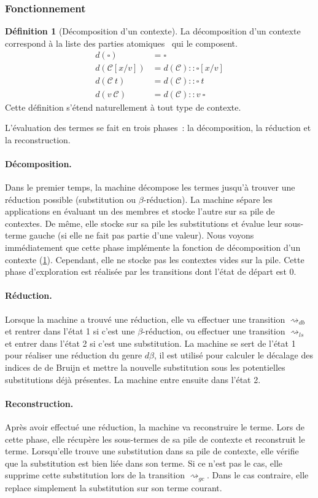 \documentclass[a4paper, 11pt]{article}
\theoremstyle{definition}
\newtheorem{definition}{Définition}[section]
\newcommand{\mcc}{\mathcal{C}}
\newcommand{\rsa}{\rightsquigarrow}
\begin{document}
\subsubsection{Fonctionnement}
\begin{definition}[Décomposition d'un contexte]
  \label{def:dec}
La décomposition d'un contexte correspond à la liste des parties \og atomiques \fg~qui le composent.
  \begin{align*}
    d(\square) &= \square \\
    d(\mcc[x/v]) &= d(\mcc)::\square[x/v]\\
    d(\mcc~t) &= d(\mcc)::\square~t\\
    d(v~\mcc) &= d(\mcc)::v~\square
  \end{align*} 
Cette définition s'étend naturellement à tout type de contexte.
\end{definition}
L'évaluation des termes se fait en trois phases~: la décomposition, la réduction et la reconstruction.
\paragraph{Décomposition.}
Dans le premier temps, la machine décompose les termes jusqu'à trouver une réduction possible (substitution ou $\beta$-réduction). 
La machine sépare les applications en évaluant un des membres et stocke l'autre sur sa pile de contextes. 
De même, elle stocke sur sa pile les substitutions et évalue leur sous-terme gauche (si elle ne fait pas partie d'une valeur). 
Nous voyons immédiatement que cette phase implémente la fonction de décomposition d'un contexte (\ref{def:dec}).
Cependant, elle ne stocke pas les contextes vides sur la pile.
Cette phase d'exploration est réalisée par les transitions dont l'état de départ est 0. 

\paragraph{Réduction.}
Lorsque la machine a trouvé une réduction, elle va effectuer une transition $\rsa_{db}$ et rentrer dans l'état 1 si c'est une $\beta$-réduction, ou effectuer une transition $\rsa_{ls}$ et entrer dans l'état 2 si c'est une substitution. 
La machine se sert de l'état 1 pour réaliser une réduction du genre $d\beta$, il est utilisé pour calculer le décalage des indices de de Bruijn et mettre la nouvelle substitution sous les potentielles substitutions déjà présentes. 
La machine entre ensuite dans l'état 2.

\paragraph{Reconstruction.}
Après avoir effectué une réduction, la machine va reconstruire le terme. 
Lors de cette phase, elle récupère les sous-termes de sa pile de contexte et reconstruit le terme. 
Lorsqu'elle trouve une substitution dans sa pile de contexte, elle vérifie que la substitution est bien liée dans son terme. 
Si ce n'est pas le cas, elle supprime cette substitution lors de la transition $\rsa_{gc}$. 
Dans le cas contraire, elle replace simplement la substitution sur son terme courant.
\end{document}
